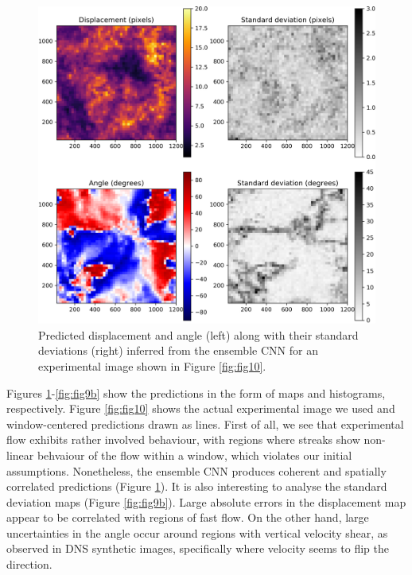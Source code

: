 \documentclass{svjour3}                     %
\begin{document}
\begin{figure}
\includegraphics[width=\textwidth]{figs/figure8a.png}
\caption{Predicted displacement and angle (left) along with their standard deviations (right) inferred from the ensemble CNN for an experimental image shown in Figure \ref{fig:fig10}.}
\label{fig:fig9a}
\end{figure}

Figures \ref{fig:fig9a}-\ref{fig:fig9b} show the predictions in the form of maps and histograms, respectively. Figure \ref{fig:fig10} shows the actual experimental image we used and window-centered predictions drawn as lines. First of all, we see that experimental flow exhibits rather involved behaviour, with regions where streaks show non-linear behvaiour of the flow within a window, which violates our initial assumptions. Nonetheless, the ensemble CNN produces coherent and spatially correlated predictions (Figure \ref{fig:fig9a}). It is also interesting to analyse the standard deviation maps (Figure \ref{fig:fig9b}). Large absolute errors in the displacement map appear to be correlated with regions of fast flow. On the other hand, large uncertainties in the angle occur around regions with vertical velocity shear, as observed in DNS synthetic images, specifically where velocity seems to flip the direction. 
\end{document}
